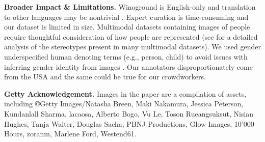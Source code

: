 \documentclass[10pt,twocolumn,letterpaper]{article}
\begin{document}
\textbf{Broader Impact \& Limitations.} Winoground is English-only and translation to other languages may be nontrivial \cite{liu-etal-2021-visually}.
Expert curation is time-consuming and our dataset is limited in size.
Multimodal datasets containing images of people require thoughtful consideration of how people are represented (see \cite{birhane2021multimodal} for a detailed analysis of the stereotypes present in many multimodal datasets).
We used gender underspecified human denoting terms (e.g., person, child) to avoid issues with inferring gender identity from images \cite{Scheuerman2019gender}.
Our annotators disproportionately come from the USA and the same could be true for our crowdworkers.


\textbf{Getty Acknowledgement.} Images in the paper are a compilation of assets, including \copyright Getty Images/Natasha Breen, Maki Nakamura, Jessica Peterson, Kundanlall Sharma, lacaosa, Alberto Bogo, Vu Le, Toson Rueangsuksut, Nisian Hughes, Tanja Walter, Douglas Sacha, PBNJ Productions, Glow Images, 10'000 Hours, zoranm, Marlene Ford, Westend61.








{\small


}
\end{document}
